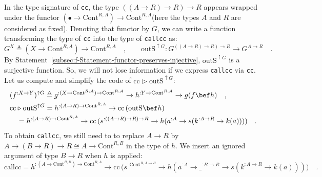 In the type signature of \lstinline!cc!, the type $((A\rightarrow R)\rightarrow R)\rightarrow R$
appears wrapped under the functor $(\bullet\rightarrow\text{Cont}^{R,A})\rightarrow\text{Cont}^{R,A}$(here
the types $A$ and $R$ are considered as fixed). Denoting that functor
by $G$, we can write a function transforming the type of \lstinline!cc!
into the type of \lstinline!callcc! as:
\[
G^{X}\triangleq(X\rightarrow\text{Cont}^{R,A})\rightarrow\text{Cont}^{R,A}\quad,\quad\quad\text{outS}^{\uparrow G}:G^{((A\rightarrow R)\rightarrow R)\rightarrow R}\rightarrow G^{A\rightarrow R}\quad.
\]
By Statement~\ref{subsec:f-Statement-functor-preserves-injective},
$\text{outS}^{\uparrow G}$ is a surjective function. So, we will
not lose information if we express \lstinline!callcc! via \lstinline!cc!.
Let us compute and simplify the code of $\text{cc}\triangleright\text{outS}^{\uparrow G}$:
\begin{align*}
 & (f^{:X\rightarrow Y})^{\uparrow G}\triangleq g^{:(X\rightarrow\text{Cont}^{R,A})\rightarrow\text{Cont}^{R,A}}\rightarrow h^{:Y\rightarrow\text{Cont}^{R,A}}\rightarrow g(f\bef h)\quad,\\
 & \text{cc}\triangleright\text{outS}^{\uparrow G}=h^{:(A\rightarrow R)\rightarrow\text{Cont}^{R,A}}\rightarrow\text{cc}\,(\text{outS}\bef h)\\
 & \quad=h^{:(A\rightarrow R)\rightarrow\text{Cont}^{R,A}}\rightarrow\text{cc}\,(s^{:((A\rightarrow R)\rightarrow R)\rightarrow R}\rightarrow h(a^{:A}\rightarrow s(k^{:A\rightarrow R}\rightarrow k(a))))\quad.
\end{align*}
To obtain \lstinline!callcc!, we still need to to replace $A\rightarrow R$
by $A\rightarrow\left(B\rightarrow R\right)\rightarrow R\cong A\rightarrow\text{Cont}^{R,B}$
in the type of $h$. We insert an ignored argument of type $B\rightarrow R$
when $h$ is applied: 
\[
\text{callcc}=h^{:(A\rightarrow\text{Cont}^{R,B})\rightarrow\text{Cont}^{R,A}}\rightarrow\text{cc}\,\big(s^{:\text{Cont}^{R,A\rightarrow R}}\rightarrow h(a^{:A}\rightarrow\_^{:B\rightarrow R}\rightarrow s(k^{:A\rightarrow R}\rightarrow k(a)))\big)\quad.
\]

